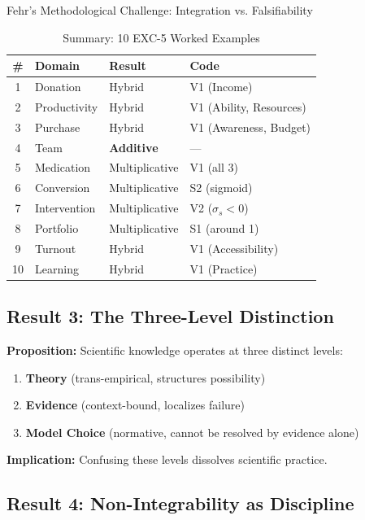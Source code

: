 \begin{chapter}{Fehr's Methodological Challenge: Integration vs. Falsifiability}
\begin{table}[h!]
\centering
\caption{Summary: 10 EXC-5 Worked Examples}
\label{tab:exc-examples-summary}
\renewcommand{\arraystretch}{1.2}
\small
\begin{tabular}{@{}clll@{}}
\toprule
\textbf{\#} & \textbf{Domain} & \textbf{Result} & \textbf{Code} \\
\midrule
1 & Donation & Hybrid & V1 (Income) \\
2 & Productivity & Hybrid & V1 (Ability, Resources) \\
3 & Purchase & Hybrid & V1 (Awareness, Budget) \\
4 & Team & \textbf{Additive} & --- \\
5 & Medication & Multiplicative & V1 (all 3) \\
6 & Conversion & Multiplicative & S2 (sigmoid) \\
7 & Intervention & Multiplicative & V2 ($\sigma_s < 0$) \\
8 & Portfolio & Multiplicative & S1 (around 1) \\
9 & Turnout & Hybrid & V1 (Accessibility) \\
10 & Learning & Hybrid & V1 (Practice) \\
\bottomrule
\end{tabular}
\end{table}

\subsection{Result 3: The Three-Level Distinction}

\begin{tcolorbox}[colback=gray!10!white,colframe=gray!75!black]
\textbf{Proposition:} Scientific knowledge operates at three distinct levels:
\begin{enumerate}[noitemsep]
    \item \textbf{Theory} (trans-empirical, structures possibility)
    \item \textbf{Evidence} (context-bound, localizes failure)
    \item \textbf{Model Choice} (normative, cannot be resolved by evidence alone)
\end{enumerate}

\textbf{Implication:} Confusing these levels dissolves scientific practice.
\end{tcolorbox}

\subsection{Result 4: Non-Integrability as Discipline}


\end{chapter}
